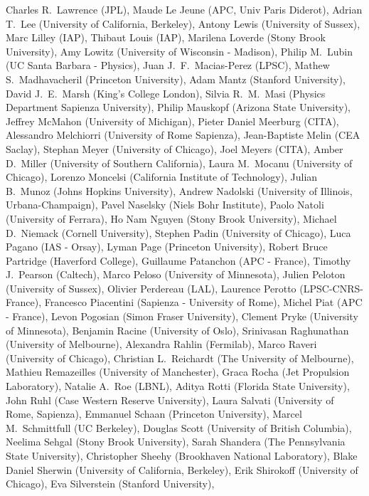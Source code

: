 Charles R.~Lawrence (JPL),
Maude Le Jeune (APC, Univ Paris Diderot),
Adrian T.~Lee (University of California, Berkeley),
Antony Lewis (University of Sussex),
Marc Lilley (IAP),
Thibaut Louis (IAP),
Marilena Loverde (Stony Brook University),
Amy Lowitz (University of Wisconsin - Madison),
Philip M.~Lubin (UC Santa Barbara - Physics),
Juan J.~F.~Macias-Perez (LPSC),
Mathew S.~Madhavacheril (Princeton University),
Adam Mantz (Stanford University),
David J.~E.~Marsh (King's College London),
Silvia R.~M.~Masi (Physics Department Sapienza University),
Philip Mauskopf (Arizona State University),
Jeffrey McMahon (University of Michigan),
Pieter Daniel Meerburg (CITA),
Alessandro Melchiorri (University of Rome Sapienza),
Jean-Baptiste Melin (CEA Saclay),
Stephan Meyer (University of Chicago),
Joel Meyers (CITA),
Amber D.~Miller (University of Southern California),
Laura M.~Mocanu (University of Chicago),
Lorenzo Moncelsi (California Institute of Technology),
Julian B.~Munoz (Johns Hopkins University),
Andrew Nadolski (University of Illinois, Urbana-Champaign),
Pavel Naselsky (Niels Bohr Institute),
Paolo Natoli (University of Ferrara),
Ho Nam Nguyen (Stony Brook University),
Michael D.~Niemack (Cornell University),
Stephen Padin (University of Chicago),
Luca Pagano (IAS - Orsay),
Lyman Page (Princeton University),
Robert Bruce Partridge (Haverford College),
Guillaume Patanchon (APC - France),
Timothy J.~Pearson (Caltech),
Marco Peloso (University of Minnesota),
Julien Peloton (University of Sussex),
Olivier Perdereau (LAL),
Laurence Perotto (LPSC-CNRS-France),
Francesco Piacentini (Sapienza - University of Rome),
Michel Piat (APC - France),
Levon Pogosian (Simon Fraser University),
Clement Pryke (University of Minnesota),
Benjamin Racine (University of Oslo),
Srinivasan Raghunathan (University of Melbourne),
Alexandra Rahlin (Fermilab),
Marco Raveri (University of Chicago),
Christian L.~Reichardt (The University of Melbourne),
Mathieu Remazeilles (University of Manchester),
Graca Rocha (Jet Propulsion Laboratory),
Natalie A.~Roe (LBNL),
Aditya Rotti (Florida State University),
John Ruhl (Case Western Reserve University),
Laura Salvati (University of Rome, Sapienza),
Emmanuel Schaan (Princeton University),
Marcel M.~Schmittfull (UC Berkeley),
Douglas Scott (University of British Columbia),
Neelima Sehgal (Stony Brook University),
Sarah Shandera (The Pennsylvania State University),
Christopher Sheehy (Brookhaven National Laboratory),
Blake Daniel Sherwin (University of California, Berkeley),
Erik Shirokoff (University of Chicago),
Eva Silverstein (Stanford University),
